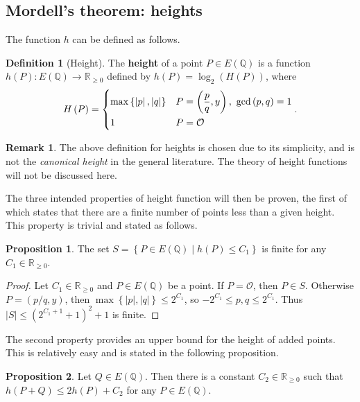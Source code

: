 \documentclass{article}
\newcommand{\Q}{\mathbb{Q}}
\newcommand{\R}{\mathbb{R}}
\newcommand{\rb}[1]{\left( #1 \right)}
\newcommand{\cb}[1]{\left\{ #1 \right\}}
\newcommand{\abs}[1]{\left\lvert #1 \right\rvert}
\theoremstyle{definition}\newtheorem*{definition}{Definition}
\theoremstyle{definition}\newtheorem*{example}{Example}
\theoremstyle{definition}\newtheorem*{remark}{Remark}
\newtheorem{proposition}{Proposition}[subsection]
\begin{document}
\pagebreak

\subsection{Mordell's theorem: heights}

The function $ h $ can be defined as follows.

\begin{definition}[Height]
The \textbf{height} of a point $ P \in E\rb{\Q} $ is a function $ h\rb{P} : E\rb{\Q} \to \R_{\ge 0} $ defined by $ h\rb{P} = \log_2\rb{H\rb{P}} $, where
$$ H\rb{P} = \begin{dcases} \max\cb{\abs{p}, \abs{q}} & P = \rb{\dfrac{p}{q}, y}, \ \gcd\rb{p, q} = 1 \\ 1 & P = \mathcal{O} \end{dcases}. $$
\end{definition}

\begin{remark}
The above definition for heights is chosen due to its simplicity, and is not the \emph{canonical height} in the general literature. The theory of height functions will not be discussed here.
\end{remark}

The three intended properties of height function will then be proven, the first of which states that there are a finite number of points less than a given height. This property is trivial and stated as follows.

\begin{proposition}
\label{prop:finiteness}
The set $ S = \cb{P \in E\rb{\Q} \mid h\rb{P} \le C_1} $ is finite for any $ C_1 \in \R_{\ge 0} $.
\end{proposition}

\begin{proof}
Let $ C_1 \in \R_{\ge 0} $ and $ P \in E\rb{\Q} $ be a point. If $ P = \mathcal{O} $, then $ P \in S $. Otherwise $ P = \rb{p / q, y} $, then $ \max\cb{\abs{p}, \abs{q}} \le 2^{C_1} $, so $ -2^{C_1} \le p, q \le 2^{C_1} $. Thus $ \abs{S} \le \rb{2^{C_1 + 1} + 1}^2 + 1 $ is finite.
\end{proof}

The second property provides an upper bound for the height of added points. This is relatively easy and is stated in the following proposition.

\begin{proposition}
\label{prop:upperbound}
Let $ Q \in E\rb{\Q} $. Then there is a constant $ C_2 \in \R_{\ge 0} $ such that $ h\rb{P + Q} \le 2h\rb{P} + C_2 $ for any $ P \in E\rb{\Q} $.
\end{proposition}
\end{document}
